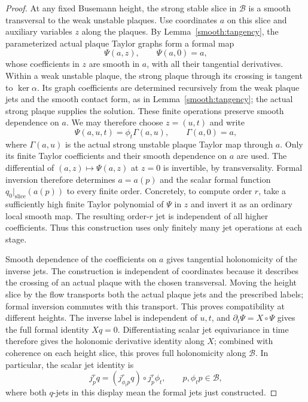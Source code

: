 \begin{proof}
At any fixed Busemann height, the strong stable slice in $\mathcal B$ is a
smooth transversal to the weak unstable plaques.  Use coordinates $a$ on
this slice and auxiliary variables $z$ along the plaques.  By
Lemma~\ref{smooth:tangency}, the parameterized actual plaque Taylor graphs
form a formal map
\[
 \Psi(a,z),\qquad \Psi(a,0)=a,
\]
whose coefficients in $z$ are smooth in $a$, with all their tangential
derivatives. Within a weak unstable plaque, the strong plaque through
its crossing is tangent to $\ker\alpha$. Its graph coefficients are
determined recursively from the weak plaque jets and the smooth contact
form, as in Lemma~\ref{smooth:tangency}; the actual strong plaque supplies
the solution. These finite operations preserve smooth dependence on $a$.
We may therefore choose $z=(u,t)$ and write
\[
 \Psi(a,u,t)=\phi_t\Gamma(a,u),\qquad \Gamma(a,0)=a,
\]
where $\Gamma(a,u)$ is the actual strong unstable plaque Taylor map
through $a$. Only its finite Taylor coefficients and their smooth
dependence on $a$ are used. The differential of $(a,z)\mapsto\Psi(a,z)$ at $z=0$ is
invertible, by transversality.  Formal inversion therefore determines
$a=a(p)$ and the scalar formal function $q_0|_{\mathrm{slice}}(a(p))$
to every finite order.  Concretely, to compute order $r$, take a sufficiently high finite
Taylor polynomial of $\Psi$ in $z$ and invert it as an ordinary local
smooth map.  The resulting order-$r$ jet is independent of all higher
coefficients.  Thus this construction uses only finitely many jet
operations at each stage.

Smooth dependence of the coefficients on $a$ gives tangential
holonomicity of the inverse jets.  The construction is independent of
coordinates because it describes the crossing of an actual plaque with
the chosen transversal.  Moving the height slice by the flow transports
both the actual plaque jets and the prescribed labels; formal inversion
commutes with this transport.  This proves compatibility at different
heights. The inverse label is independent of $u,t$, and
$\partial_t\Psi=X\circ\Psi$ gives the full formal identity $Xq=0$.
Differentiating scalar jet equivariance in time therefore gives the
holonomic derivative identity along $X$; combined with coherence on
each height slice, this proves full holonomicity along $\mathcal B$.
In particular, the scalar jet identity is
\[
 j^r_p q=(j^r_{\phi_t p}q)\circ j^r_p\phi_t,
 \qquad p,\phi_t p\in\mathcal B,
\]
where both $q$-jets in this display mean the formal jets just constructed.
\end{proof}

